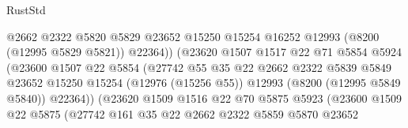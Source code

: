 \begin{lexlean}{RustStd}
\begin{coremodule}
                                      @2662
                                      @2322
                                      @5820
                                      @5829
                                      @23652
                                      @15250
                                      @15254
                                      @16252
                                      @12993
                                      (@8200 (@12995 @5829 @5821))
                                      @22364))
                                  (@23620
                                    @1507
                                    @1517
                                    @22
                                    @71
                                    @5854
                                    @5924
                                    (@23600
                                      @1507
                                      @22
                                      @5854
                                      (@27742
                                        @55
                                        @35
                                        @22
                                        @2662
                                        @2322
                                        @5839
                                        @5849
                                        @23652
                                        @15250
                                        @15254
                                        (@12976 (@15256 @55))
                                        @12993
                                        (@8200 (@12995 @5849 @5840))
                                        @22364))
                                    (@23620
                                      @1509
                                      @1516
                                      @22
                                      @70
                                      @5875
                                      @5923
                                      (@23600
                                        @1509
                                        @22
                                        @5875
                                        (@27742
                                          @161
                                          @35
                                          @22
                                          @2662
                                          @2322
                                          @5859
                                          @5870
                                          @23652

\end{coremodule}
\end{lexlean}
